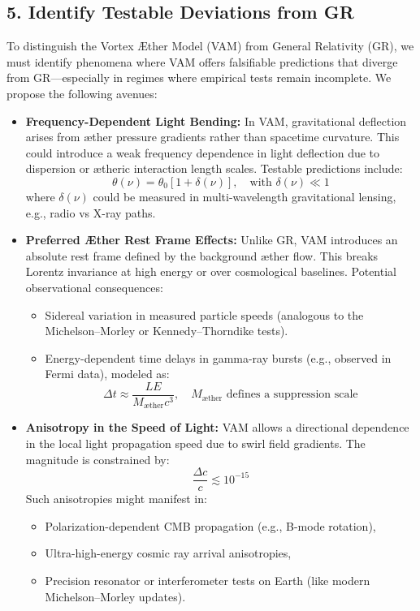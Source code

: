 \subsection*{5. Identify Testable Deviations from GR}

To distinguish the Vortex Æther Model (VAM) from General Relativity (GR), we must identify phenomena where VAM offers falsifiable predictions that diverge from GR—especially in regimes where empirical tests remain incomplete. We propose the following avenues:

\begin{itemize}
    \item \textbf{Frequency-Dependent Light Bending:} In VAM, gravitational deflection arises from æther pressure gradients rather than spacetime curvature. This could introduce a weak frequency dependence in light deflection due to dispersion or ætheric interaction length scales. Testable predictions include:
    \[
    \theta(\nu) = \theta_0 \left[ 1 + \delta(\nu) \right], \quad \text{with } \delta(\nu) \ll 1
    \]
    where \( \delta(\nu) \) could be measured in multi-wavelength gravitational lensing, e.g., radio vs X-ray paths.

    \item \textbf{Preferred Æther Rest Frame Effects:} Unlike GR, VAM introduces an absolute rest frame defined by the background æther flow. This breaks Lorentz invariance at high energy or over cosmological baselines. Potential observational consequences:
    \begin{itemize}
        \item Sidereal variation in measured particle speeds (analogous to the Michelson–Morley or Kennedy–Thorndike tests).
        \item Energy-dependent time delays in gamma-ray bursts (e.g., observed in Fermi data), modeled as:
        \[
        \Delta t \approx \frac{L E}{M_\text{æther} c^3}, \quad M_\text{æther} \text{ defines a suppression scale}
        \]
    \end{itemize}

    \item \textbf{Anisotropy in the Speed of Light:} VAM allows a directional dependence in the local light propagation speed due to swirl field gradients. The magnitude is constrained by:
    \[
    \frac{\Delta c}{c} \lesssim 10^{-15}
    \]
    Such anisotropies might manifest in:
    \begin{itemize}
        \item Polarization-dependent CMB propagation (e.g., B-mode rotation),
        \item Ultra-high-energy cosmic ray arrival anisotropies,
        \item Precision resonator or interferometer tests on Earth (like modern Michelson–Morley updates).
    \end{itemize}
\end{itemize}

